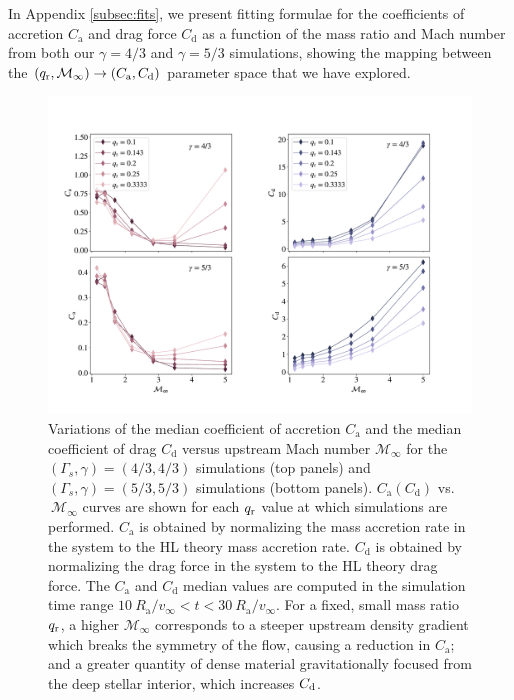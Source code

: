 In Appendix \ref{subsec:fits}, we present fitting formulae for the coefficients of accretion $C_{\mathrm a}$ and drag force $C_{\mathrm d}$ as a function of the mass ratio and Mach number from both our $\gamma = 4/3$ and $\gamma = 5/3$ simulations, showing the mapping between the $(q_{\rm r}, \mathcal{M}_\infty) \rightarrow (C_{\mathrm a}, C_{\mathrm d})$ parameter space that we have explored. 



\begin{figure}
  \centering
  \includegraphics[width=\textwidth]{figures/common_envelope/gamma_43_53_Ca_Cd_vs_mach_q_comparison_inc_mdotdrag.pdf}
  \caption{Variations of the median coefficient of accretion $C_{\mathrm a}$ and the median coefficient of drag $C_{\mathrm d}$ versus upstream Mach number $\mathcal{M}_\infty$ for the $(\Gamma_s, \gamma) = (4/3, 4/3)$ simulations (top panels) and $(\Gamma_s, \gamma) = (5/3, 5/3)$ simulations (bottom panels). $C_{\mathrm a} (C_{\mathrm d})$ vs. $~\mathcal{M}_\infty$ curves are shown for each $q_{\rm r}$ value at which simulations are performed. $C_{\mathrm a}$ is obtained by normalizing the mass accretion rate in the system to the HL theory mass accretion rate. $C_{\mathrm d}$ is obtained by normalizing the drag force in the system to the HL theory drag force. The $C_{\mathrm a}$ and $C_{\mathrm d}$ median values are computed in the simulation time range $10~R_{\mathrm{a}}/v_\infty < t < 30~R_{\mathrm{a}}/v_\infty$. For a fixed, small mass ratio $q_{\rm r}$, a higher $\mathcal{M_\infty}$ corresponds to a steeper upstream density gradient which breaks the symmetry of the flow, causing a reduction in $C_{\mathrm a}$; and a greater quantity of dense material gravitationally focused from the deep stellar interior, which increases $C_{\rm d}$. \label{fig:datapoints_Ca_Cd_vs_mach_g43_g53_sims}}
\vspace*{1cm}
\end{figure}


